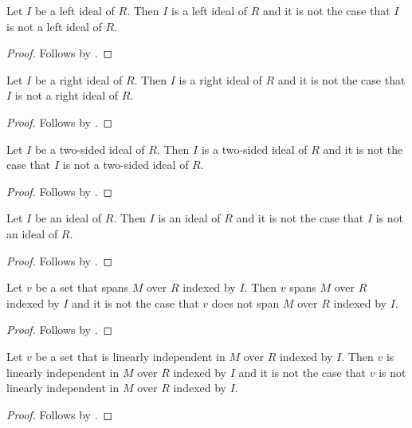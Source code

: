 \begin{proposition}\label{spike_use_left_ideal}
    Let $I$ be a left ideal of $R$.
    Then $I$ is a left ideal of $R$ and it is not the case that
        $I$ is not a left ideal of $R$.
\end{proposition}
\begin{proof} Follows by \auto. \end{proof}

\begin{proposition}\label{spike_use_right_ideal}
    Let $I$ be a right ideal of $R$.
    Then $I$ is a right ideal of $R$ and it is not the case that
        $I$ is not a right ideal of $R$.
\end{proposition}
\begin{proof} Follows by \auto. \end{proof}

\begin{proposition}\label{spike_use_two_sided_ideal}
    Let $I$ be a two-sided ideal of $R$.
    Then $I$ is a two-sided ideal of $R$ and it is not the case that
        $I$ is not a two-sided ideal of $R$.
\end{proposition}
\begin{proof} Follows by \auto. \end{proof}

\begin{proposition}\label{spike_use_ideal}
    Let $I$ be an ideal of $R$.
    Then $I$ is an ideal of $R$ and it is not the case that
        $I$ is not an ideal of $R$.
\end{proposition}
\begin{proof} Follows by \auto. \end{proof}

\begin{proposition}\label{spike_use_indexed_spanning}
    Let $v$ be a set that spans $M$ over $R$ indexed by $I$.
    Then $v$ spans $M$ over $R$ indexed by $I$ and it is not the case that
        $v$ does not span $M$ over $R$ indexed by $I$.
\end{proposition}
\begin{proof} Follows by \auto. \end{proof}

\begin{proposition}\label{spike_use_indexed_linear_independence}
    Let $v$ be a set that is linearly independent in $M$ over $R$
        indexed by $I$.
    Then $v$ is linearly independent in $M$ over $R$ indexed by $I$ and
        it is not the case that
            $v$ is not linearly independent in $M$ over $R$ indexed by $I$.
\end{proposition}
\begin{proof} Follows by \auto. \end{proof}

